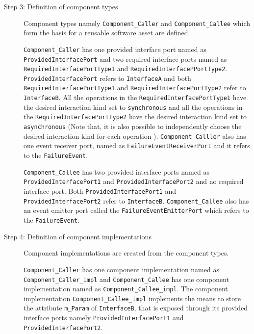 \begin{description}
\item [Step 3: Definition of component types] Component types namely \texttt{Component\allowbreak\_Caller} and \texttt{Component\allowbreak\_Callee} which form the basis for a reusable software asset are defined. 

\texttt{Component\allowbreak\_Caller} has one provided interface port named as \texttt{ProvidedInterface\allowbreak Port} and two required interface ports named as \texttt{RequiredInterface\allowbreak PortType1} and \texttt{RequiredInterfaceP\allowbreak PortType2}. \texttt{ProvidedInterface\allowbreak Port} refers to \texttt{InterfaceA} and both \texttt{RequiredInterface\allowbreak PortType1} and \texttt{RequiredInterface\allowbreak PortType2} refer to \texttt{InterfaceB}. All the operations in the \texttt{RequiredInterface\allowbreak PortType1} have the desired interaction kind set to \texttt{synchronous} and all the operations in the \texttt{RequiredInterface\allowbreak PortType2} have the desired interaction kind set to \texttt{asynchronous} (Note that, it is also possible to independently choose the desired interaction kind for each operation \cite{SpecMetamodel}). \texttt{Component\allowbreak\_Calller} also has one event receiver port, named as \texttt{FailureEvent\allowbreak ReceiverPort} and it refers to the \texttt{FailureEvent}.

\texttt{Component\_Callee} has two provided interface ports named as \texttt{ProvidedInterface\allowbreak Port1} and \texttt{ProvidedInterface\allowbreak Port2} and no required interface port. Both \texttt{ProvidedInterface\allowbreak Port1} and \texttt{ProvidedInterface\allowbreak Port2} refer to \texttt{InterfaceB}. \texttt{Component\allowbreak\_Callee} also has an event emitter port called the \texttt{FailureEvent\allowbreak EmitterPort} which refers to the \texttt{FailureEvent}.

\item [Step 4: Definition of component implementations] Component implementations are created from the component types.

\texttt{Component\allowbreak\_Caller} has one component implementation named as \texttt{Component\allowbreak\_Caller\_impl} and \texttt{Component\allowbreak\_Callee} has one component implementation named as \texttt{Component\allowbreak\_Callee\_impl}. The component implementation \texttt{Component\allowbreak\_Callee\_impl} implements the means to store the attribute \texttt{m\_Param} of \texttt{InterfaceB}, that is exposed through its provided interface ports namely \texttt{ProvidedInterface\allowbreak Port1} and \texttt{ProvidedInterface\allowbreak Port2}.


\end{description}
